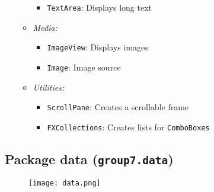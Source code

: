 \documentclass{article}
\begin{document}
\begin{itemize}
\begin{itemize}
\begin{itemize}
            \item \texttt{TextArea}: Displays long text
        \end{itemize}
        \item \textit{Media:}
        \begin{itemize}
            \item \texttt{ImageView}: Displays images
            \item \texttt{Image}: Image source
        \end{itemize}
        \item \textit{Utilities:}
        \begin{itemize}
            \item \texttt{ScrollPane}: Creates a scrollable frame
            \item \texttt{FXCollections}: Creates lists for \texttt{ComboBoxes}
        \end{itemize}
    \end{itemize}
\end{itemize}

\subsection{Package data (\texttt{group7.data})}
\noindent 
\begin{figure}[h!]
    \centering
    \texttt{[image: data.png]} %
\end{figure}
\end{document}

